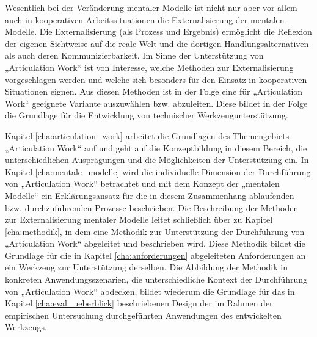 Wesentlich bei der Veränderung mentaler Modelle ist nicht nur aber vor allem auch in kooperativen Arbeitssituationen die Externalisierung der mentalen Modelle. Die Externalisierung (als Prozess und Ergebnis) ermöglicht die Reflexion der eigenen Sichtweise auf die reale Welt und die dortigen Handlungsalternativen als auch deren Kommunizierbarkeit. Im Sinne der Unterstützung von „Articulation Work“ ist von Interesse, welche Methoden zur Externalisierung vorgeschlagen werden und welche sich besonders für den Einsatz in kooperativen Situationen eignen. Aus diesen Methoden ist in der Folge eine für „Articulation Work“ geeignete Variante auszuwählen bzw. abzuleiten. Diese bildet in der Folge die Grundlage für die Entwicklung von technischer Werkzeugunterstützung. 

Kapitel \ref{cha:articulation_work} arbeitet die Grundlagen des Themengebiets „Articulation Work“ auf und geht auf die Konzeptbildung in diesem Bereich, die unterschiedlichen Ausprägungen und die Möglichkeiten der Unterstützung ein. In Kapitel \ref{cha:mentale_modelle} wird die individuelle Dimension der Durchführung von „Articulation Work“ betrachtet und mit dem Konzept der „mentalen Modelle“ ein Erklärungsansatz für die in diesem Zusammenhang ablaufenden bzw. durchzuführenden Prozesse beschrieben. Die Beschreibung der Methoden zur Externalisierung mentaler Modelle leitet schließlich über zu Kapitel \ref{cha:methodik}, in dem eine Methodik zur Unterstützung der Durchführung von „Articulation Work“ abgeleitet und beschrieben wird. Diese Methodik bildet die Grundlage für die in Kapitel \ref{cha:anforderungen} abgeleiteten Anforderungen an ein Werkzeug zur Unterstützung derselben. Die Abbildung der Methodik in konkreten Anwendungsszenarien, die unterschiedliche Kontext der Durchführung von „Articulation Work“ abdecken, bildet wiederum die Grundlage für das in Kapitel \ref{cha:eval_ueberblick} beschriebenen Design der im Rahmen der empirischen Untersuchung durchgeführten Anwendungen des entwickelten Werkzeugs.






